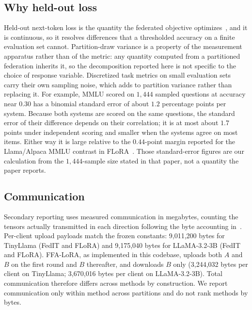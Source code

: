 \subsection{Why held-out loss}
Held-out next-token loss is the quantity the federated objective optimizes~\cite{mcmahan2017fedavg}, and it is continuous, so it resolves differences that a thresholded accuracy on a finite evaluation set cannot. Partition-draw variance is a property of the measurement apparatus rather than of the metric: any quantity computed from a partitioned federation inherits it, so the decomposition reported here is not specific to the choice of response variable. Discretized task metrics on small evaluation sets carry their own sampling noise, which adds to partition variance rather than replacing it. For example, MMLU scored on $1{,}444$ sampled questions at accuracy near $0.30$ has a binomial standard error of about $1.2$ percentage points per system. Because both systems are scored on the same questions, the standard error of their difference depends on their correlation; it is at most about $1.7$ points under independent scoring and smaller when the systems agree on most items. Either way it is large relative to the $0.44$-point margin reported for the Llama/Alpaca MMLU contrast in FLoRA~\cite{wang2024flora}. Those standard-error figures are our calculation from the $1{,}444$-sample size stated in that paper, not a quantity the paper reports.

\subsection{Communication}
Secondary reporting uses measured communication in megabytes, counting the tensors actually transmitted in each direction following the byte accounting in~\cite{franklin2026adaptive}. Per-client upload payloads match the frozen constants: 9{,}011{,}200 bytes for TinyLlama (FedIT and FLoRA) and 9{,}175{,}040 bytes for LLaMA-3.2-3B (FedIT and FLoRA). FFA-LoRA, as implemented in this codebase, uploads both $A$ and $B$ on the first round and $B$ thereafter, and downloads $B$ only (3{,}244{,}032 bytes per client on TinyLlama; 3{,}670{,}016 bytes per client on LLaMA-3.2-3B). Total communication therefore differs across methods by construction. We report communication only within method across partitions and do not rank methods by bytes.

